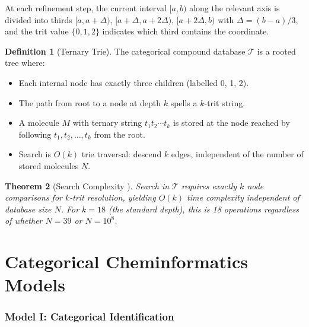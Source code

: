 \documentclass[11pt,twocolumn,a4paper]{article}
\newtheorem{theorem}{Theorem}[section]
\theoremstyle{definition}
\newtheorem{definition}[theorem]{Definition}
\theoremstyle{remark}
\newcommand{\Trie}{\mathcal{T}}
\begin{document}
At each refinement step, the current interval $[a, b)$ along the relevant axis is divided into thirds $[a, a + \Delta)$, $[a + \Delta, a + 2\Delta)$, $[a + 2\Delta, b)$ with $\Delta = (b-a)/3$, and the trit value $\{0, 1, 2\}$ indicates which third contains the coordinate.

\begin{definition}[Ternary Trie]
\label{def:trie}
The categorical compound database $\Trie$ is a rooted tree where:
\begin{itemize}[nosep]
\item Each internal node has exactly three children (labelled 0, 1, 2).
\item The path from root to a node at depth $k$ spells a $k$-trit string.
\item A molecule $M$ with ternary string $t_1 t_2 \cdots t_k$ is stored at the node reached by following $t_1, t_2, \ldots, t_k$ from the root.
\item Search is $O(k)$ trie traversal: descend $k$ edges, independent of the number of stored molecules $N$.
\end{itemize}
\end{definition}

\begin{theorem}[Search Complexity {\citep[Theorem~6.2]{sachikonye2025c}}]
\label{thm:search_complexity}
Search in $\Trie$ requires exactly $k$ node comparisons for $k$-trit resolution, yielding $O(k)$ time complexity independent of database size $N$. For $k = 18$ (the standard depth), this is 18 operations regardless of whether $N = 39$ or $N = 10^8$.
\end{theorem}



\part{Categorical Cheminformatics Models}

\section{Model I: Categorical Identification}
\label{sec:model1}
\end{document}
